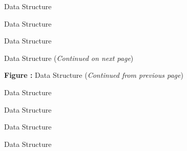 \clearpage
\begin{figure}[!htp]
\centering

\caption{ Data Structure}
\label{f:BCData}
\end{figure}

\clearpage
\begin{figure}[!htp]
\centering
%
\resizebox{!}{\textheight-2\baselineskip}{}
\caption{ Data Structure}
\label{f:BCDataSet}
\end{figure}

\clearpage
\begin{figure}[!htp]
\centering

\caption{ Data Structure}
\label{f:BCProperty}
\end{figure}

\clearpage
\begin{figure}[!htp]
\centering
\resizebox{\linewidth}{!}{}
\caption[ Data Structure]{ Data Structure (\textit{Continued on next page})}
\label{f:CGNSBase}
\end{figure}
\clearpage
\begin{figure}[!htp]
\centering
\resizebox{\linewidth}{!}{}
\par\vspace{\abovecaptionskip}
\textbf{Figure :}  Data Structure (\textit{Continued from previous page})
\end{figure}

\clearpage
\begin{figure}[!htp]
\centering

\caption{ Data Structure}
\label{f:ChemicalKineticsModel}
\end{figure}

\clearpage
\begin{figure}[!htp]
\centering

\caption{ Data Structure}
\label{f:ConvergenceHistory}
\end{figure}

\clearpage
\begin{figure}[!htp]
\centering

\caption{ Data Structure}
\label{f:DataArray}
\end{figure}

\clearpage
\begin{figure}[!htp]
\centering

\caption{ Data Structure}
\label{f:DimensionalExponents}
\end{figure}

